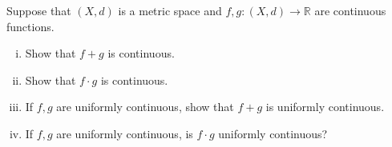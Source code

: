 \documentclass[11pt,letterpaper]{article}
\newcommand{\R}{\mathbb{R}}
\newenvironment{prob}[1]
  {\renewcommand\theinnerprob{#1}\innerprob}
  {\endinnerprob}
\begin{document}
\begin{prob}{7} %
Suppose that $(X,d)$ is a metric space and $f, g: (X,d) \to \R$ are continuous functions.
\begin{enumerate}[(i)]
	\item Show that $f+g$ is continuous.
	
	\item Show that $f\cdot g$ is continuous.  
	
	\item If $f,g$ are uniformly continuous, show that $f+g$ is uniformly continuous.
	
	\item If $f,g$ are uniformly continuous, is $f\cdot g$ uniformly continuous?
	
\end{enumerate}
\end{prob}
\end{document}
